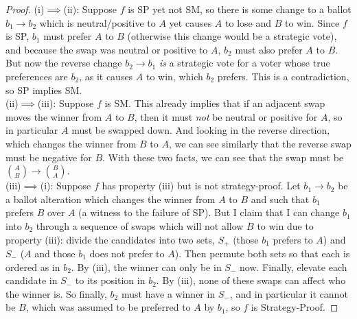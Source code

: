 \documentclass{amsart}
\begin{document}
\begin{proof}
	(i)$\implies $(ii): Suppose $f$ is SP yet not SM, so there is some change to a ballot $b_1\to b_2$ which is neutral/positive to $A$ yet causes $A$ to lose and $B$ to win. Since $f$ is SP, $b_1$ must prefer $A$ to $B$ (otherwise this change would be a strategic vote), and because the swap was neutral or positive to $A$, $b_2$ must also prefer $A$ to $B$. But now the reverse change $b_2\to b_1$ \textit{is} a strategic vote for a voter whose true preferences are $b_2$, as it causes $A$ to win, which $b_2$ prefers. This is a contradiction, so SP implies SM.\\
%	
	
	(ii)$\implies$(iii): Suppose $f$ is SM. This already implies that if an adjacent swap moves the winner from $A$ to $B$, then it must \textit{not} be neutral or positive for $A$, so in particular $A$ must be swapped down. And looking in the reverse direction, which changes the winner from $B$ to $A$, we can see similarly that the reverse swap must be negative for $B$. With these two facts, we can see that the swap must be ${A\choose B}\to {B \choose A}$.\\
	
	
	(iii)$\implies$(i): Suppose $f$ has property (iii) but is not strategy-proof. Let $b_1\to b_2$ be a ballot alteration which changes the winner from $A$ to $B$ and such that $b_1$ prefers $B$ over $A$ (a witness to the failure of SP). But I claim that I can change $b_1$ into $b_2$ through a sequence of swaps which will not allow $B$ to win due to property (iii): divide the candidates into two sets, $S_+$ (those $b_1$ prefers to $A$) and $S_-$ ($A$ and those $b_1$ does not prefer to $A$). Then permute both sets so that each is ordered as in $b_2$. By (iii), the winner can only be in $S_-$ now. Finally, elevate each candidate in $S_-$ to its position in $b_2$. By (iii), none of these swaps can affect who the winner is. So finally, $b_2$ must have a winner in $S_-$, and in particular it cannot be $B$, which was assumed to be preferred to $A$ by $b_1$, so $f$ is Strategy-Proof.
\end{proof}\\
\end{document}

